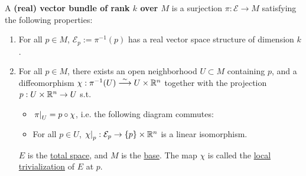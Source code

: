 \documentclass{article}
\begin{document}
\begin{definition}
    A \textbf{(real) vector bundle of rank $k$ over $M$} is a surjection $\pi: \mathcal{E} \to M$ satisfying the following properties:
    \begin{enumerate}
        \item For all $p \in M$, $\mathcal{E}_p := \pi^{-1}(p)$ has a real vector space structure of dimension $k$.
        \item For all $p \in M$, there exists an open neighborhood $U \subset M$ containing $p$, and a diffeomorphism $\chi: \pi^{-1}(U) \overset{\sim}{\longrightarrow} U \times \mathbb{R}^n$ together with the projection $p: U \times \mathbb{R}^n \to U$ s.t.
        \begin{itemize}
            \item $\left.\pi\right|_{U} = p \circ \chi$, i.e. the following diagram commutes:
            
            \begin{minipage}{\linewidth}
                \centering
            \end{minipage}
            \item For all $p \in U$, $\left.\chi\right|_{p}: \mathcal{E}_p \to \{p\} \times \mathbb{R}^n$ is a linear isomorphism.
        \end{itemize}
        $E$ is the \underline{total space}, and $M$ is the \underline{base}. The map $\chi$ is called the \underline{local trivialization} of $E$ at $p$.
    \end{enumerate}
\end{definition}
\end{document}

